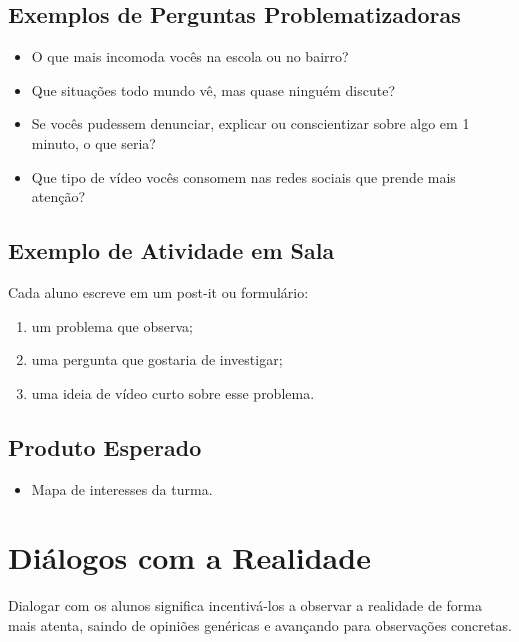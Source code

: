 \documentclass[
  letterpaper,
  DIV=11,
  numbers=noendperiod]{scrreport}
\providecommand{\tightlist}{%
  \setlength{\itemsep}{0pt}\setlength{\parskip}{0pt}}
\begin{document}
\subsection{Exemplos de Perguntas
Problematizadoras}\label{exemplos-de-perguntas-problematizadoras}

\begin{itemize}
\tightlist
\item
  O que mais incomoda vocês na escola ou no bairro?
\item
  Que situações todo mundo vê, mas quase ninguém discute?
\item
  Se vocês pudessem denunciar, explicar ou conscientizar sobre algo em 1
  minuto, o que seria?
\item
  Que tipo de vídeo vocês consomem nas redes sociais que prende mais
  atenção?
\end{itemize}

\subsection{Exemplo de Atividade em
Sala}\label{exemplo-de-atividade-em-sala}

Cada aluno escreve em um post-it ou formulário:

\begin{enumerate}
\def\labelenumi{\arabic{enumi}.}
\tightlist
\item
  um problema que observa;
\item
  uma pergunta que gostaria de investigar;
\item
  uma ideia de vídeo curto sobre esse problema.
\end{enumerate}

\subsection{Produto Esperado}\label{produto-esperado}

\begin{itemize}
\tightlist
\item
  Mapa de interesses da turma.
\end{itemize}

\section{Diálogos com a Realidade}\label{diuxe1logos-com-a-realidade}

Dialogar com os alunos significa incentivá-los a observar a realidade de
forma mais atenta, saindo de opiniões genéricas e avançando para
observações concretas.
\end{document}
